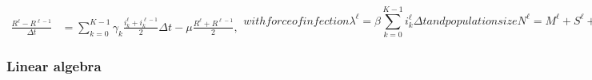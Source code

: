 \documentclass[USenglish]{article}
\begin{document}
\begin{subequations}
\begin{align}
\begin{split}
    \end{split}
    \\
    \frac{R^{\ell} - R^{\ell - 1}}{\Delta t}
    &= \sum_{k = 0}^{K - 1} \gamma_k
    \frac{i_k^{\ell} + i_k^{\ell - 1}}{2}
    \Delta t
    - \mu \frac{R^{\ell} + R^{\ell - 1}}{2},
  \end{align}
  with force of infection
  \begin{equation}
    \lambda^{\ell} =
    \beta \sum_{k = 0}^{K - 1} i_k^{\ell} \Delta t
  \end{equation}
  and population size
  \begin{equation}
    N^{\ell} =
    M^{\ell} + S^{\ell} + R^{\ell}
    + \sum_{k = 0}^{K - 1} \left(
      e_k^{\ell} + i_k^{\ell}
    \right) \Delta t.
  \end{equation}
\end{subequations}


\subsubsection{Linear algebra}
\end{document}
